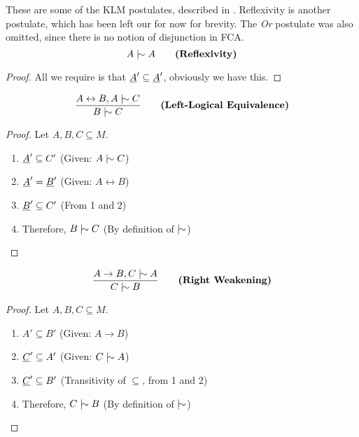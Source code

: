 \documentclass[11pt]{article}
\begin{document}
These are some of the KLM postulates, described in \cite{kaliski2020overview}. Reflexivity is another postulate, which has been left our for now for brevity. The \textit{Or} postulate was also omitted, since there is no notion of disjunction in FCA.
\begin{equation}
  A \twiddle A \qquad \textbf{(Reflexivity)}
\end{equation}

\begin{proof}
  All we require is that $\underline{A}' \subseteq \underline{A}'$, obviously we have this.
\end{proof}

\begin{equation}
  \frac{A \leftrightarrow B, A \twiddle C}{B \twiddle C} \qquad \textbf{(Left-Logical Equivalence)}
\end{equation}

\begin{proof}
  Let $A, B, C \subseteq M$.
  \begin{enumerate}
    \item $\underline{A}' \subseteq C'$ \hfill (Given: $A \twiddle C$)
    \item $\underline{A}' = \underline{B}'$ \hfill (Given: $A \leftrightarrow B$)
    \item $\underline{B}' \subseteq C'$ \hfill (From 1 and 2)
    \item Therefore, $B \twiddle C$ \hfill (By definition of $\twiddle$)
  \end{enumerate}
\end{proof}

\begin{equation}
  \frac{A \rightarrow B, C \twiddle A}{C \twiddle B} \qquad \textbf{(Right Weakening)}
\end{equation}

\begin{proof}
  Let $A, B, C \subseteq M$.
  \begin{enumerate}
    \item $A' \subseteq B'$ \hfill (Given: $A \rightarrow B$)
    \item $\underline{C}' \subseteq A'$ \hfill (Given: $C \twiddle A$)
    \item $\underline{C}' \subseteq B'$ \hfill (Transitivity of $\subseteq$, from 1 and 2)
    \item Therefore, $C \twiddle B$ \hfill (By definition of $\twiddle$)
  \end{enumerate}
\end{proof}
\end{document}
